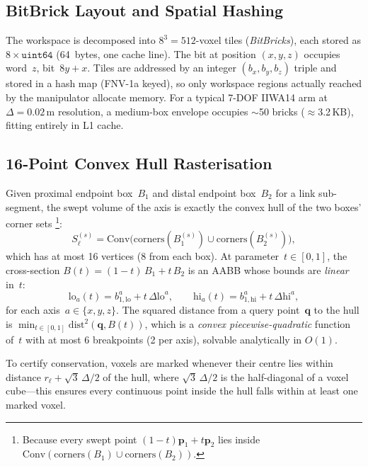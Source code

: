 \documentclass[journal]{IEEEtran}
\begin{document}
\subsection{BitBrick Layout and Spatial Hashing}\label{sec:bitbrick}

The workspace is decomposed into $8^3{=}512$-voxel tiles
(\emph{BitBricks}), each stored as $8{\times}\mathtt{uint64}$
(64~bytes, one cache line).
The bit at position $(x,y,z)$ occupies word~$z$, bit~$8y{+}x$.
Tiles are addressed by an integer $(b_x,b_y,b_z)$ triple
and stored in a hash map (FNV-1a keyed), so only workspace regions
actually reached by the manipulator allocate memory.
For a typical 7-DOF IIWA14 arm at $\Delta{=}0.02$\,m resolution,
a medium-box envelope occupies $\sim$50 bricks ($\approx$3.2\,KB),
fitting entirely in L1 cache.

\subsection{16-Point Convex Hull Rasterisation}\label{sec:hull16}

Given proximal endpoint box~$B_1$ and distal endpoint box~$B_2$
for a link sub-segment, the swept volume of the axis is exactly
the convex hull of the two boxes' corner sets%
\footnote{Because every swept point $(1{-}t)\bm{p}_1+t\bm{p}_2$
lies inside $\mathrm{Conv}(\mathrm{corners}(B_1)\cup\mathrm{corners}(B_2))$.}:
\begin{equation}\label{eq:hull16}
  S_\ell^{(s)} = \mathrm{Conv}\bigl(
    \mathrm{corners}(B_1^{(s)}) \cup \mathrm{corners}(B_2^{(s)})
  \bigr),
\end{equation}
which has at most 16 vertices (8 from each box).
At parameter~$t \in [0,1]$, the cross-section
$B(t) = (1{-}t)\,B_1 + t\,B_2$ is an AABB whose bounds are
\emph{linear} in~$t$:
\begin{equation}\label{eq:bt_linear}
  \mathrm{lo}_a(t) = b_{1,\mathrm{lo}}^a + t\,\Delta\mathrm{lo}^a, \qquad
  \mathrm{hi}_a(t) = b_{1,\mathrm{hi}}^a + t\,\Delta\mathrm{hi}^a,
\end{equation}
for each axis~$a \in \{x,y,z\}$.
The squared distance from a query point~$\bm{q}$ to the hull is
$\min_{t \in [0,1]} \mathrm{dist}^2(\bm{q}, B(t))$, which is a
\emph{convex piecewise-quadratic} function of~$t$ with at most
6 breakpoints (2 per axis), solvable analytically in $O(1)$.

To certify conservation, voxels are marked whenever their
centre lies within distance $r_\ell + \sqrt{3}\,\Delta/2$ of
the hull, where $\sqrt{3}\,\Delta/2$ is the half-diagonal of a
voxel cube---this ensures every continuous point inside the hull
falls within at least one marked voxel.
\end{document}
